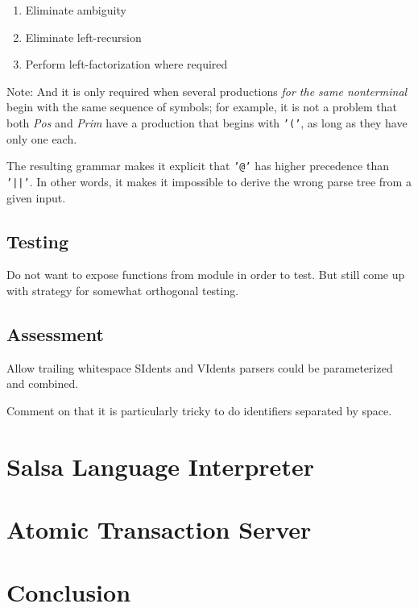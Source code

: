 \documentclass[
paper=a4,
oneside,
fontsize=11pt,
numbers=noenddot,
headinclude=false, %
footinclude=false, %
fleqn,             %
DIV=8
]{scrartcl}
\begin{document}
\begin{enumerate}
\item Eliminate ambiguity
\item Eliminate left-recursion
\item Perform left-factorization where required
\end{enumerate}

Note: And it is only required when several productions {\em for the same
  nonterminal} begin with the same sequence of symbols; for example, it is not a
problem that both {\em Pos} and {\em Prim} have a production that begins with
{\tt '('}, as long as they have only one each.

The resulting grammar makes it explicit that {\tt '@'} has higher precedence
than {\tt '||'}. In other words, it makes it impossible to derive the wrong
parse tree from a given input.

\subsection{Testing}
\label{sec:testing}

Do not want to expose functions from module in order to test. But still come up
with strategy for somewhat orthogonal testing.

\subsection{Assessment}
\label{sec:assessment}

Allow trailing whitespace
SIdents and VIdents parsers could be parameterized and combined.

Comment on that it is particularly tricky to do identifiers separated by space.

\section{Salsa Language Interpreter}

\section{Atomic Transaction Server}

\section{Conclusion}




\end{document}
